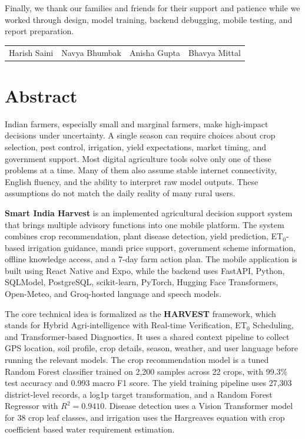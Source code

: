 \documentclass[12pt,a4paper]{report}
\newcommand{\ProjectName}{Smart India Harvest}
\newcommand{\FrameworkName}{HARVEST}
\begin{document}
Finally, we thank our families and friends for their support and patience while we worked through design, model training, backend debugging, mobile testing, and report preparation.

\vspace{1.4cm}
\begin{center}
\begin{tabular}{llll}
Harish Saini & Navya Bhumbak & Anisha Gupta & Bhavya Mittal
\end{tabular}
\end{center}

\singlespacing

\chapter*{Abstract}
\thispagestyle{fancy}
\doublespacing

Indian farmers, especially small and marginal farmers, make high-impact decisions under uncertainty. A single season can require choices about crop selection, pest control, irrigation, yield expectations, market timing, and government support. Most digital agriculture tools solve only one of these problems at a time. Many of them also assume stable internet connectivity, English fluency, and the ability to interpret raw model outputs. These assumptions do not match the daily reality of many rural users.

\textbf{\ProjectName} is an implemented agricultural decision support system that brings multiple advisory functions into one mobile platform. The system combines crop recommendation, plant disease detection, yield prediction, ET$_0$-based irrigation guidance, mandi price support, government scheme information, offline knowledge access, and a 7-day farm action plan. The mobile application is built using React Native and Expo, while the backend uses FastAPI, Python, SQLModel, PostgreSQL, scikit-learn, PyTorch, Hugging Face Transformers, Open-Meteo, and Groq-hosted language and speech models.

The core technical idea is formalized as the \textbf{\FrameworkName} framework, which stands for Hybrid Agri-intelligence with Real-time Verification, ET$_0$ Scheduling, and Transformer-based Diagnostics. It uses a shared context pipeline to collect GPS location, soil profile, crop details, season, weather, and user language before running the relevant models. The crop recommendation model is a tuned Random Forest classifier trained on 2,200 samples across 22 crops, with 99.3\% test accuracy and 0.993 macro F1 score. The yield training pipeline uses 27,303 district-level records, a log1p target transformation, and a Random Forest Regressor with $R^2 = 0.9410$. Disease detection uses a Vision Transformer model for 38 crop leaf classes, and irrigation uses the Hargreaves equation with crop coefficient based water requirement estimation.
\end{document}
